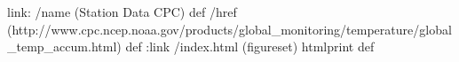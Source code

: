 link:
/name (Station Data CPC) def
/href (http://www.cpc.ncep.noaa.gov/products/global_monitoring/temperature/global_temp_accum.html) def
:link
/index.html {(figureset) htmlprint} def

\begin{ingrid}

\end{ingrid}